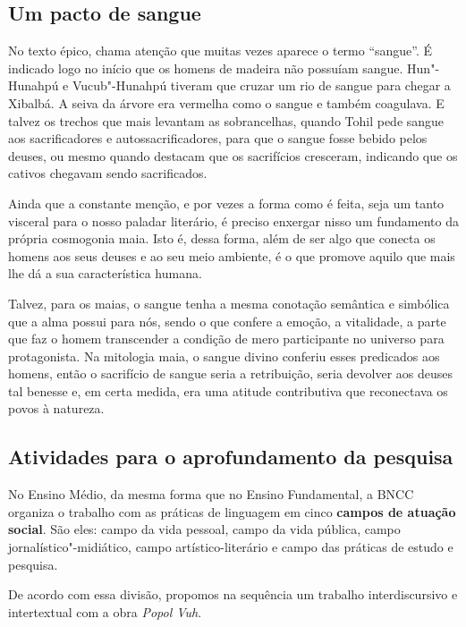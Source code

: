 \documentclass[11pt]{extarticle}
\begin{document}
\subsection{Um pacto de sangue}

No texto épico, chama atenção que muitas vezes aparece o termo
``sangue''. É indicado logo no início que os homens de madeira não
possuíam sangue. Hun"-Hunahpú e Vucub"-Hunahpú tiveram que cruzar um rio
de sangue para chegar a Xibalbá. A seiva da árvore era vermelha como o
sangue e também coagulava. E talvez os trechos que mais levantam as
sobrancelhas, quando Tohil pede sangue aos sacrificadores e
autossacrificadores, para que o sangue fosse bebido pelos deuses, ou
mesmo quando destacam que os sacrifícios cresceram, indicando que os
cativos chegavam sendo sacrificados.

Ainda que a constante menção, e por vezes a forma como é feita, seja um
tanto visceral para o nosso paladar literário, é preciso enxergar nisso
um fundamento da própria cosmogonia maia. Isto é, dessa forma, além de
ser algo que conecta os homens aos seus deuses e ao seu meio ambiente, é
o que promove aquilo que mais lhe dá a sua característica humana.

Talvez, para os maias, o sangue tenha a mesma conotação semântica e
simbólica que a alma possui para nós, sendo o que confere a emoção, a
vitalidade, a parte que faz o homem transcender a condição de mero
participante no universo para protagonista. Na mitologia maia, o sangue
divino conferiu esses predicados aos homens, então o sacrifício de
sangue seria a retribuição, seria devolver aos deuses tal benesse e, em
certa medida, era uma atitude contributiva que reconectava os povos à
natureza.




\subsection{Atividades para o aprofundamento da pesquisa}

No Ensino Médio, da mesma forma que no Ensino Fundamental, a BNCC
organiza o trabalho com as práticas de linguagem em cinco \textbf{campos
de atuação social}. São eles: campo da vida pessoal, campo da vida
pública, campo jornalístico"-midiático, campo artístico-literário e campo
das práticas de estudo e pesquisa.

De acordo com essa divisão, propomos na sequência um trabalho
interdiscursivo e intertextual com a obra \emph{Popol Vuh}.
\end{document}
